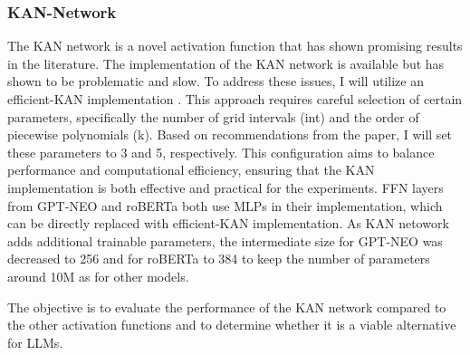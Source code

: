 \subsubsection{KAN-Network}
The KAN network is a novel activation function that has shown promising results in the literature. The implementation of the KAN network is available but has shown to be problematic and slow. To address these issues, I will utilize an efficient-KAN implementation \cite{efficient-kan}. This approach requires careful selection of certain parameters, specifically the number of grid intervals (int) and the order of piecewise polynomials (k). Based on recommendations from the paper, I will set these parameters to 3 and 5, respectively. This configuration aims to balance performance and computational efficiency, ensuring that the KAN implementation is both effective and practical for the experiments. FFN layers from GPT-NEO and roBERTa both use MLPs in their implementation, which can be directly replaced with efficient-KAN implementation. As KAN netowork adds additional trainable parameters, the intermediate size for GPT-NEO was decreased to 256 and for roBERTa to 384 to keep the number of parameters around 10M as for other models. 


The objective is to evaluate the performance of the KAN network compared to the other activation functions and to determine whether it is a viable alternative for LLMs.